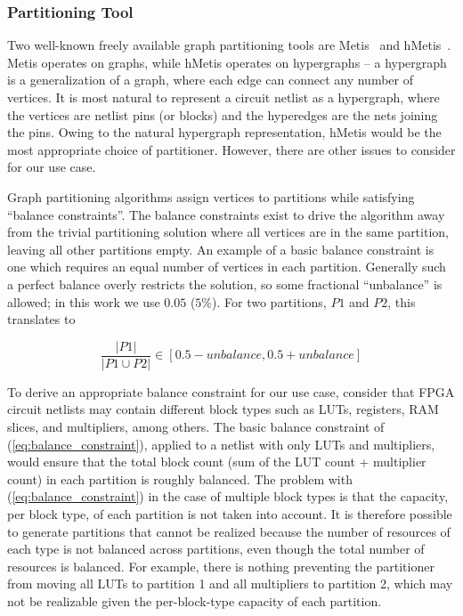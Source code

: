 \subsubsection{Partitioning Tool}
Two well-known freely available graph partitioning tools are Metis~\cite{karypis1998multilevelmetis} and hMetis~\cite{karypis1999multilevelhmetis}. Metis operates on graphs, while hMetis operates on hypergraphs -- a hypergraph is a generalization of a graph, where each edge can connect any number of vertices. It is most natural to represent a circuit netlist as a hypergraph, where the vertices are netlist pins (or blocks) and the hyperedges are the nets joining the pins. Owing to the natural hypergraph representation, hMetis would be the most appropriate choice of partitioner. However, there are other issues to consider for our use case.

Graph partitioning algorithms assign vertices to partitions while satisfying ``balance constraints''. The balance constraints exist to drive the algorithm away from the trivial partitioning solution where all vertices are in the same partition, leaving all other partitions empty. An example of a basic balance constraint is one which requires an equal number of vertices in each partition. Generally such a perfect balance overly restricts the solution, so some fractional ``unbalance'' is allowed; in this work we use $0.05$ ($5\%$). For two partitions, $P1$ and $P2$, this translates to~\cite{karypismanual}

\begin{equation}\label{eq:balance_constraint}
\frac{|P1|}{|P1 \cup P2|} \in [0.5 - unbalance, 0.5 + unbalance]
\end{equation}

To derive an appropriate balance constraint for our use case, consider that FPGA circuit netlists may contain different block types such as LUTs, registers, RAM slices, and multipliers, among others. The basic balance constraint of (\ref{eq:balance_constraint}), applied to a netlist with only LUTs and multipliers, would ensure that the total block count (sum of the LUT count + multiplier count) in each partition is roughly balanced. The problem with (\ref{eq:balance_constraint}) in the case of multiple block types is that the capacity, per block type, of each partition is not taken into account. It is therefore possible to generate partitions that cannot be realized because the number of resources of each type is not balanced across partitions, even though the total number of resources is balanced. For example, there is nothing preventing the partitioner from moving all LUTs to partition 1 and all multipliers to partition 2, which may not be realizable given the per-block-type capacity of each partition.

